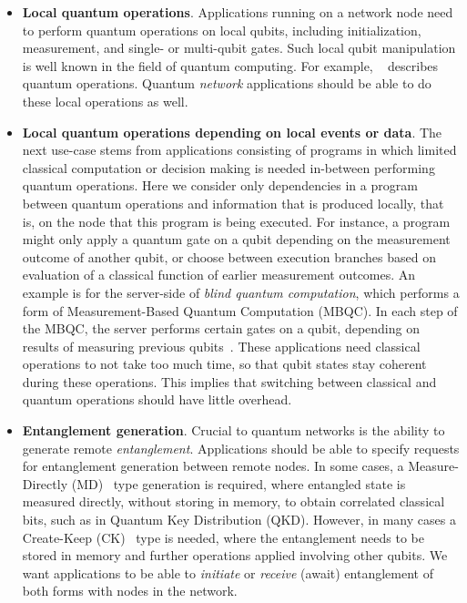 \begin{itemize}
      \item \textbf{Local quantum operations}.
            Applications running on a network node need to perform quantum operations on local qubits, including initialization, measurement, and single- or multi-qubit gates.
            Such local qubit manipulation is well known in the field of quantum computing. For example, \openqasm~\cite{cross2017openqasm} describes quantum operations.
            Quantum \textit{network} applications should be able to do these local operations as well.

      \item \textbf{Local quantum operations depending on local events or data}.
            The next use-case stems from applications consisting of programs in which limited classical computation or decision making is needed in-between performing quantum operations.
            Here we consider only dependencies in a program between quantum operations and information that is produced locally, that is, on the node that this program is being executed.
            For instance, a program might only apply a quantum gate on a qubit depending on the measurement outcome of another qubit, or choose between execution branches based on evaluation of a classical function of earlier measurement outcomes.
            An example is for the server-side of \textit{blind quantum computation}, which performs a form of Measurement-Based Quantum Computation (MBQC).
            In each step of the MBQC, the server performs certain gates on a qubit, depending on results of measuring previous qubits~\cite{fitzsimons2017private}.
            These applications need classical operations to not take too much time, so that qubit states stay coherent during these operations.
            This implies that switching between classical and quantum operations should have little overhead.

      \item \textbf{Entanglement generation}.
            Crucial to quantum networks is the ability to generate remote \textit{entanglement}.
            Applications should be able to specify requests for entanglement generation between remote nodes.
            In some cases, a Measure-Directly (MD)~\cite{dahlberg2019linklayer} type generation is required, where entangled state is measured directly, without storing in memory, to obtain correlated classical bits, such as in Quantum Key Distribution (QKD).
            However, in many cases a Create-Keep (CK)~\cite{dahlberg2019linklayer} type is needed, where the entanglement needs to be stored in memory and further operations applied involving other qubits.
            We want applications to be able to \textit{initiate} or \textit{receive} (await) entanglement of both forms with nodes in the network.


\end{itemize}
